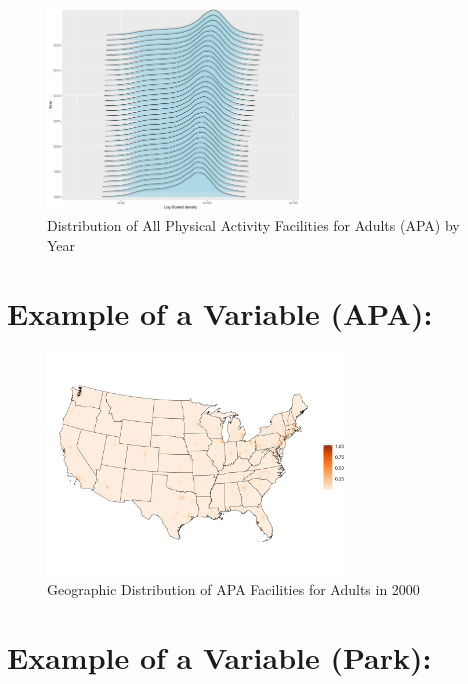 \documentclass[
  letterpaper,
  DIV=11,
  numbers=noendperiod]{scrartcl}
\begin{document}
\begin{figure}

{\centering \includegraphics[width=0.6\textwidth,height=\textheight]{imgs/ggridge_histogram_apa_log.png}

}

\caption{Distribution of All Physical Activity Facilities for Adults
(APA) by Year}

\end{figure}

\hypertarget{example-of-a-variable-apa-1}{%
\section{Example of a Variable
(APA):}\label{example-of-a-variable-apa-1}}

\begin{figure}

{\centering \includegraphics[width=0.7\textwidth,height=\textheight]{imgs/apa_2000.png}

}

\caption{Geographic Distribution of APA Facilities for Adults in 2000}

\end{figure}

\hypertarget{example-of-a-variable-park}{%
\section{Example of a Variable
(Park):}\label{example-of-a-variable-park}}
\end{document}
